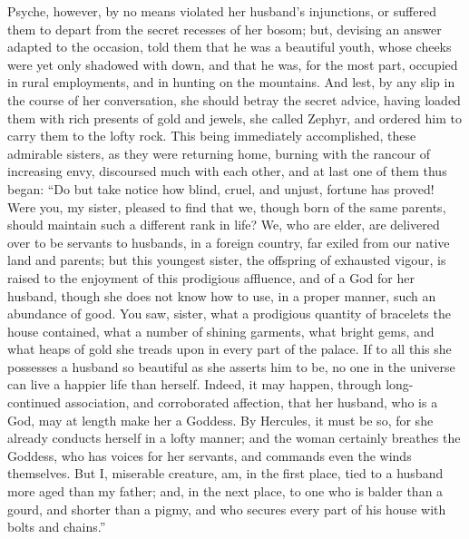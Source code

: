 \documentclass{article}
\begin{document}
Psyche, however, by no means violated her husband's injunctions, or suffered
them to depart from the secret recesses of her bosom; but, devising an answer
adapted to the occasion, told them that he was a beautiful youth, whose cheeks
were yet only shadowed with down, and that he was, for the most part, occupied
in rural employments, and in hunting on the mountains. And lest, by any slip in
the course of her conversation, she should betray the secret advice, having
loaded them with rich presents of gold and jewels, she called Zephyr, and
ordered him to carry them to the lofty rock. This being immediately
accomplished, these admirable sisters, as they were returning home, burning
with the rancour of increasing envy, discoursed much with each other, and at
last one of them thus began: ``Do but take notice how blind, cruel, and unjust,
fortune has proved! Were you, my sister, pleased to find that we, though born
of the same parents, should maintain such a different rank in life? We, who are
elder, are delivered over to be servants to husbands, in a foreign country, far
exiled from our native land and parents; but this youngest sister, the
offspring of exhausted vigour, is raised to the enjoyment of this prodigious
affluence, and of a God for her husband, though she does not know how to use,
in a proper manner, such an abundance of good. You saw, sister, what a
prodigious quantity of bracelets the house contained, what a number of shining
garments, what bright gems, and what heaps of gold she treads upon in every
part of the palace. If to all this she possesses a husband so beautiful as she
asserts him to be, no one in the universe can live a happier life than herself.
Indeed, it may happen, through long-continued association, and corroborated
affection, that her husband, who is a God, may at length make her a Goddess. By
Hercules, it must be so, for she already conducts herself in a lofty manner;
and the woman certainly breathes the Goddess, who has voices for her servants,
and commands even the winds themselves. But I, miserable creature, am, in the
first place, tied to a husband more aged than my father; and, in the next
place, to one who is balder than a gourd, and shorter than a pigmy, and who
secures every part of his house with bolts and chains.''
\end{document}
